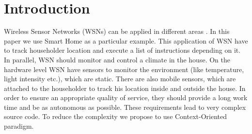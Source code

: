 \documentclass{ubicomp-ext}
\begin{document}
\begin{abstract}
\end{abstract}
\section{Introduction}
Wireless Sensor Networks (WSNs) can be applied in different areas \cite{pastor08}. In this paper we use Smart Home as a particular example. This application of WSN have to track householder location and execute a list of instructions depending on it. In parallel, WSN should monitor and control a climate in the house. On the hardware level WSN have sensors to monitor the environment (like temperature, light intensity etc.), which are static. There are also mobile sensors, which are attached to the householder to track his location inside and outside the house. In order to ensure an appropriate quality of service, they should provide a long work time and be as autonomous as possible. These requirements lead to very complex source code. To reduce the complexity we propose to use Context-Oriented paradigm.
\end{document}
